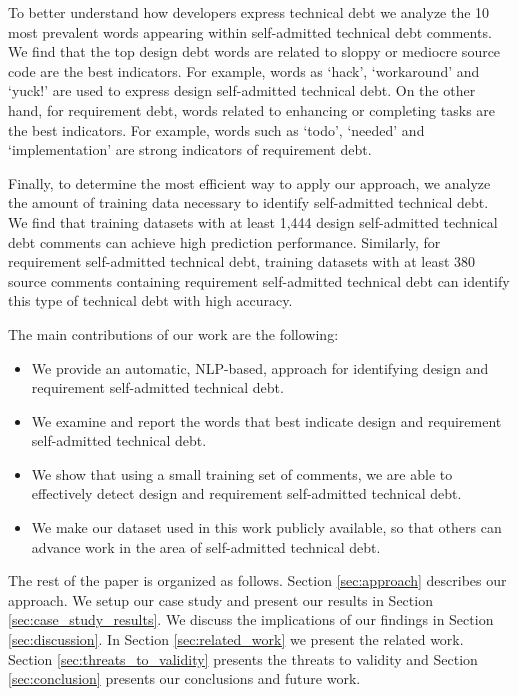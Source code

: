 \documentclass[10pt,journal,compsoc]{IEEEtran}
\newcommand{\SATD}{self-admitted technical debt\xspace}
\begin{document}
To better understand how developers express technical debt we analyze the 10 most prevalent words appearing within \SATD comments. 
We find that the top design debt words are related to sloppy or mediocre source code are the best indicators. For example, words as `hack', `workaround' and `yuck!' are used to express design \SATD. On the other hand, for requirement debt, words related to enhancing or completing tasks are the best indicators. For example, words such as `todo', `needed' and `implementation' are strong indicators of requirement debt. 

Finally, to determine the most efficient way to apply our approach, we analyze the amount of training data necessary to identify \SATD. We find that training datasets with at least 1,444 design \SATD comments can achieve high prediction performance. Similarly, for requirement \SATD, training datasets with at least 380 source comments containing requirement \SATD can identify this type of technical debt with high accuracy.  

The main contributions of our work are the following:
\vspace{-1.5mm}
\begin{itemize}
  \item We provide an automatic, NLP-based, approach for identifying design and requirement \SATD.
  \item We examine and report the words that best indicate design and requirement \SATD.
  \item We show that using a small training set of comments, we are able to effectively detect design and requirement \SATD.
  \item We make our dataset used in this work publicly available, so that others can advance work in the area of \SATD.
\end{itemize}

The rest of the paper is organized as follows. Section \ref{sec:approach} describes our approach. We setup our case study and present our
results in Section \ref{sec:case_study_results}. We discuss the implications of our findings in Section \ref{sec:discussion}. In Section \ref{sec:related_work} we present the related work. Section \ref{sec:threats_to_validity} presents the threats to validity and Section \ref{sec:conclusion} presents our conclusions and future work.  
\end{document}
